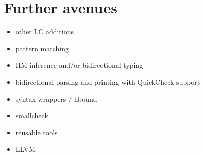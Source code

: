\documentclass{beamer}
\begin{document}

\section{Further avenues}

\begin{frame}[c]
\begin{itemize}
\item other LC additions
\item pattern matching
\item HM inference and/or bidirectional typing
\item bidirectional parsing and printing with QuickCheck support
\item syntax wrappers / hbound
\item smallcheck
\item reusable tools 
\item LLVM
\end{itemize}
\end{frame}
\end{document}
